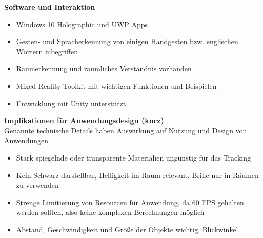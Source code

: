 \textbf{Software und Interaktion}\\
\begin{itemize}
	\item Windows 10 Holographic und UWP Apps
	\item Gesten- und Spracherkennung von einigen Handgesten bzw. englischen Wörtern inbegriffen
	\item Raumerkennung und räumliches Verständnis vorhanden
	\item Mixed Reality Toolkit mit wichtigen Funktionen und Beispielen
	\item Entwicklung mit Unity unterstützt
\end{itemize}


\textbf{Implikationen für Anwendungsdesign (kurz)}\\
Genannte technische Details haben Auswirkung auf Nutzung und Design von Anwendungen
\begin{itemize}
	\item Stark spiegelnde oder transparente Materialien ungünstig für das Tracking
	\item Kein Schwarz darstellbar, Helligkeit im Raum relevant, Brille nur in Räumen zu verwenden
	\item Strenge Limitierung von Resourcen für Anwendung, da 60 FPS gehalten werden sollten, also keine komplexen Berechnungen möglich
	\item Abstand, Geschwindigkeit und Größe der Objekte wichtig, Blickwinkel
\end{itemize}
